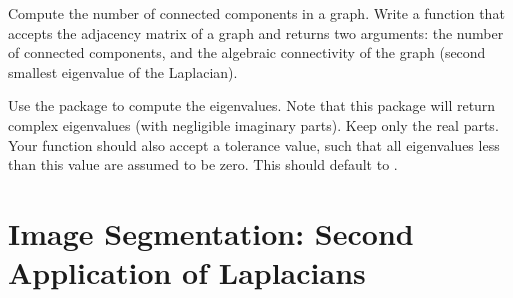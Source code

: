 \begin{problem}
\leavevmode
Compute the number of connected components in a graph.
Write a function that accepts the adjacency matrix of a graph and returns two arguments: the number of connected components, and the algebraic connectivity of the graph (second smallest eigenvalue of the Laplacian).

Use the  package to compute the eigenvalues.
Note that this package will return complex eigenvalues (with negligible imaginary parts). Keep only the real parts.
Your function should also accept a tolerance value, such that all eigenvalues less than this value are assumed to be zero.
This should default to .

\begin{comment}
Here is a function that creates a random symmetric matrix of Boolean values with sparsity determined by the input \li{c}.
\begin{lstlisting}
def sparse_generator(n, c):
    ''' Return a symmetric nxn matrix with sparsity determined by c.
    Inputs:
        n (int): dimension of matrix
        c (float): a float in [0,1]. Larger values of c will produce
             matrices with more entries equal to zero.
    '''
    A = np.random.rand(n**2).reshape((n, n))
    A = ( A > c**(.5) )
    return A.T.dot(A)
\end{lstlisting}

Test your function on matrices created by \li{sparse_generator} with inputs $n = 10, 100$ and $c = .25, .5, .95$. 
What do you notice about the likelihood that a random graph is connected?
\end{comment}

\end{problem}


\section*{Image Segmentation: Second Application of Laplacians}

